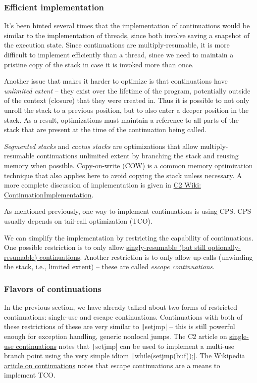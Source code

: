 \documentclass[]{article}
\begin{document}
\subsubsection{Efficient implementation}
\label{sec:thre}

It's been hinted several times that the implementation of continuations would be similar to the implementation of threads, since both involve saving a snapshot of the execution state. Since continuations are multiply-resumable, it is more difficult to implement efficiently than a thread, since we need to maintain a pristine copy of the stack in case it is invoked more than once.

Another issue that makes it harder to optimize is that continuations have \textit{unlimited extent} -- they exist over the lifetime of the program, potentially outside of the context (closure) that they were created in. Thus it is possible to not only unroll the stack to a previous position, but to also enter a deeper position in the stack. As a result, optimizations must maintain a reference to all parts of the stack that are present at the time of the continuation being called.

\textit{Segmented stacks} and \textit{cactus stacks} are optimizations that allow multiply-resumable continuations unlimited extent by branching the stack and reusing memory when possible. Copy-on-write (COW) is a common memory optimization technique that also applies here to avoid copying the stack unless necessary. A more complete discussion of implementation is given in \href{https://wiki.c2.com/?ContinuationImplementation}{C2 Wiki: ContinuationImplementation}.

As mentioned previously, one way to implement continuations is using CPS. CPS usually depends on tail-call optimization (TCO).

We can simplify the implementation by restricting the capability of continuations. One possible restriction is to only allow \href{http://c2.com/wiki/remodel/?SingleUseContinuation}{singly-resumable (but still optionally-resumable) continuations}. Another restriction is to only allow up-calls (unwinding the stack, i.e., limited extent) -- these are called \textit{escape continuations}.

\subsubsection{Flavors of continuations}
\label{sec:flav}

In the previous section, we have already talked about two forms of restricted continuations: single-use and escape continuations. Continuations with both of these restrictions of these are very similar to \texttt|setjmp| -- this is still powerful enough for exception handling, generic nonlocal jumps. The C2 article on \href{http://c2.com/wiki/remodel/?SingleUseContinuation}{single-use continuations} notes that \texttt|setjmp| can be used to implement a multi-use branch point using the very simple idiom \texttt|while(setjmp(buf));|. The \href{https://en.wikipedia.org/wiki/Continuation#Kinds}{Wikipedia article on continuations} notes that escape continuations are a means to implement TCO.
\end{document}
